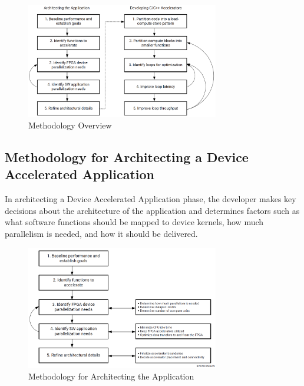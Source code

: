 \begin{figure}[H]
    \begin{center}
        \includegraphics[width=0.75\textwidth]{images/Methodology.PNG}
        \caption{Methodology Overview}
        \label{Methodology}
    \end{center}
\end{figure}

\clearpage
\subsection{Methodology for Architecting a Device Accelerated Application}
In architecting a Device Accelerated Application phase, the developer makes key decisions about the architecture of the application and determines factors such as what software functions should be mapped to device kernels, how much parallelism is needed, and how it should be delivered.

\begin{figure}[H]
    \begin{center}
        \includegraphics[width=0.75\textwidth]{images/MethodologyArchitect.PNG}
        \caption{Methodology for Architecting the Application}
        \label{MethodologyArchitect}
    \end{center}
\end{figure}

